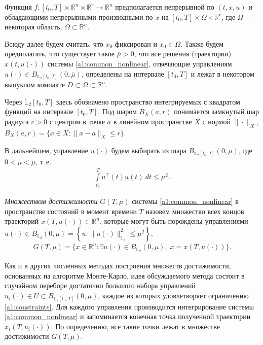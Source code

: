 \documentclass[../main.tex]{subfiles}
\begin{document}
  Функция $ f: [t_0, {T}] \times  \mathbb{R}^n \times \mathbb{R}^r \rightarrow \mathbb{R}^{n} $ предполагается непрерывной по $(t,x,u)$ и обладающими непрерывными производными по $ x $ на  $ [t_0, {T}] \times \Omega \times \mathbb{R}^r $, где $\Omega$~--- некоторая область, $\Omega \subset \mathbb{R}^n$.  
  
  Всюду далее будем считать, что $x_0$ фиксирован и  $x_0 \in  \Omega $.
  Также будем предполагать, что существует такое $\overline{\mu} > 0 $, что все решения (траектории) $ x(t, u(\cdot)) $ системы \eqref{a1:common_nonlinear}, отвечающие управлениям $u(\cdot) \in B_{\mathbb{L}_2[t_0, {T}]}(0,\overline{\mu})$,  определены на интервале $ [t_0,{T}] $ и лежат в некотором выпуклом компакте $D \subset \Omega \subset \mathbb{R}^n$. 
  
  Через $\mathbb{L}_2[t_0, {T}]$ здесь обозначено пространство интегрируемых с квадратом функций на интервале $[t_0, {T}]$. 
  Под шаром $B_X(a,r)$ понимается замкнутый шар радиуса $r>0$ с центром в точке $a$ в линейном пространстве $X$ с нормой $\|\cdot\|_X$, $B_X(a, r) = \{x\in X: \|x-a\|_X \leqslant r \}$.
  
  В дальнейшем, управление $ u(\cdot) $ будем выбирать из шара $ B_{\mathbb{L}_2[t_0, {T}]}(0,\mu) $, где $ 0 < \mu < \overline{\mu} $, т.\,е.
  \begin{gather}\label{a1:constraints}
  	\int\limits_{t_0}^T u^{\top}(t) u(t) \ dt \leqslant \mu^2.
  \end{gather}
  
  {\sl Множеством достижимости } $ G(T,\mu) $ системы \eqref{a1:common_nonlinear} в пространстве состояний в момент времени $ T $ назовем множество всех концов траекторий $ x(T, u(\cdot)) \in \mathbb{R}^n $,  которые могут быть порождены управлениями $ u(\cdot) \in B_{\mathbb{L}_2}(0,\mu) =\left\lbrace u:\lVert u(\cdot)\rVert^2_{\mathbb{L}_2} \leqslant \mu^2\right\rbrace  $,
  \begin{gather*}
  	G(T,\mu)=\{x\in \mathbb{R}^n:\exists u(\cdot)\in B_{\mathbb{L}_2}(0,\mu),\; x=x(T,u(\cdot))\}.
  \end{gather*}
  
  Как и в других численных методах построения множеств достижимости, основанных на алгоритме Монте-Карло, идея обсуждаемого метода состоит в случайном переборе достаточно большого набора управлений $u_i(\cdot) \in U \subset B_{\mathbb{L}_2[t_0, {T}]}(0,\mu) $, каждое из которых удовлетворяет ограничению \eqref{a1:constraints}.
  Для каждого управления производится интегрирование системы \eqref{a1:common_nonlinear} и запоминается конечная точка полученной траектории $x_i(T, u_i(\cdot))$. 
  По определению, все такие точки лежат в множестве достижимости $G(T,\mu)$.
  
\end{document}
